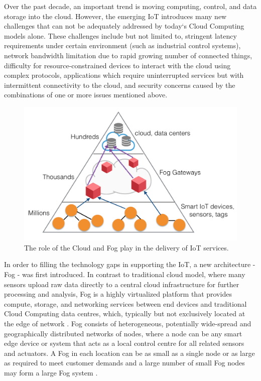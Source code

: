 Over the past decade, an important trend is moving computing, control, and data storage into the cloud. However, the emerging IoT introduces many new challenges that can not be adequately addressed by today`s Cloud Computing models alone. These challenges \cite{7498684} include but not limited to, stringent latency requirements under certain environment (such as industrial control systems), network bandwidth limitation due to rapid growing number of connected things, difficulty for resource-constrained devices to interact with the cloud using complex protocols, applications which require uninterrupted services but with intermittent connectivity to the cloud, and security concerns caused by the combinations of one or more issues mentioned above.

\begin{figure}[!htbp]
\centering
\includegraphics[scale = 0.55]{fog_computing.png}
\caption[The role of the Cloud and Fog play in the delivery of IoT services]{The role of the Cloud and Fog play in the delivery of IoT services. \cite{7123563}} 
\label{fig:fog_computing}
\end{figure}

In order to filling the technology gaps in supporting the IoT, a new architecture - Fog - was first introduced. In contrast to traditional cloud model, where many sensors upload raw data directly to a central cloud infrastructure for further processing and analysis, Fog is a highly virtualized platform that provides compute, storage, and networking services between end devices and traditional Cloud Computing data centres, which, typically but not exclusively located at the edge of network \cite{Bonomi:2012:FCR:2342509.2342513}.  Fog consists of heterogeneous, potentially wide-spread and geographically distributed networks of nodes, where a node can be any smart edge device or system that acts as a local control centre for all related sensors and actuators. A Fog in each location can be as small as a single node or as large as required to meet customer demands and a large number of small Fog nodes may form a large Fog system \cite{7498684}. 

